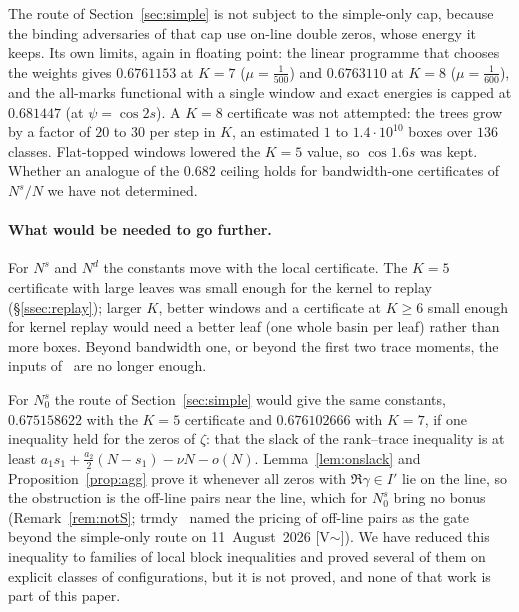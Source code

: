 The route of Section~\ref{sec:simple} is not subject to the simple-only cap, because the binding adversaries of that cap use on-line double
zeros, whose energy it keeps. Its own limits, again in floating point: the linear programme that chooses the weights gives $0.6761153$ at
$K=7$ ($\mu=\frac1{500}$) and $0.6763110$ at $K=8$ ($\mu=\frac1{600}$), and the all-marks functional with a single window and exact energies is
capped at $0.681447$ (at $\psi=\cos2s$). A $K=8$ certificate was not attempted: the trees grow by a factor of $20$ to $30$ per step in $K$, an
estimated $1$ to $1.4\cdot10^{10}$ boxes over $136$ classes. Flat-topped windows lowered the $K=5$ value, so $\cos1.6s$ was kept. Whether an analogue of
the $0.682$ ceiling holds for bandwidth-one certificates of $N^s/N$ we have not determined.

\paragraph{What would be needed to go further.} For $N^s$ and $N^d$ the constants move with the local certificate. The $K=5$ certificate with large leaves was small
enough for the kernel to replay (\S\ref{ssec:replay}); larger $K$, better windows and a certificate at $K\ge6$ small enough for kernel
replay would need a better leaf (one whole basin per leaf) rather than more boxes. Beyond bandwidth one, or beyond
the first two trace moments, the inputs of~\cite{AF} are no longer enough.

For $N_0^s$ the route of Section~\ref{sec:simple} would give the same constants, $0.675158622$ with the $K=5$ certificate and $0.676102666$ with
$K=7$, if one inequality held for the zeros of $\zeta$: that the slack of the rank--trace inequality is at least
$a_1s_1+\frac{a_2}2(N-s_1)-\nu N-o(N)$. Lemma~\ref{lem:onslack} and Proposition~\ref{prop:agg} prove it whenever all zeros with $\Re\gamma\in I'$
lie on the line, so the obstruction is the off-line pairs near the line, which for $N_0^s$ bring no bonus (Remark~\ref{rem:notS}; \mbox{trmdy}~\cite{trmdy} named the pricing of off-line pairs as the gate
beyond the simple-only route on 11~August~2026 [V$\sim$]). We have
reduced this inequality to families of local block inequalities and proved several of them on explicit classes of configurations, but it is
not proved, and none of that work is part of this paper.
